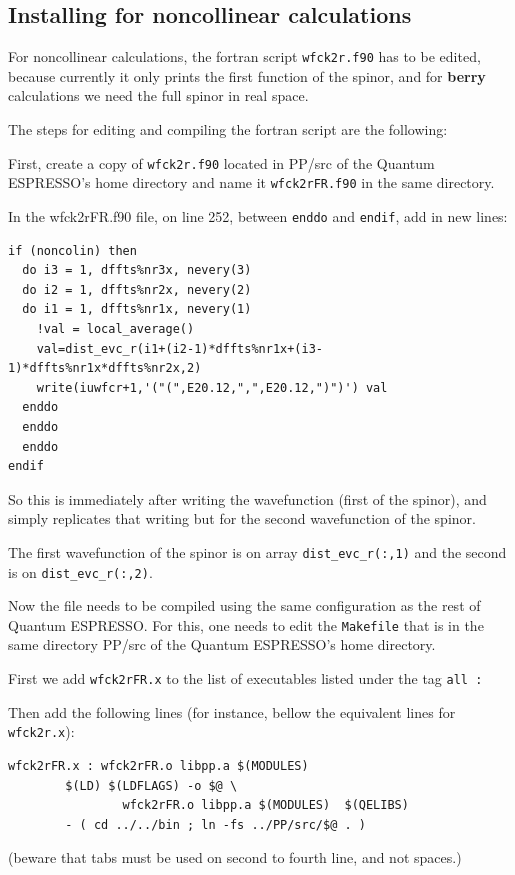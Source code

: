\documentclass[a4paper,12pt]{report}
\begin{document}
\begin{appendices}

\chapter{Installing for noncollinear calculations}
\label{ch:noncolinear}

For noncollinear calculations, the fortran script \verb|wfck2r.f90| has to be edited,
because currently it only prints the first function of the spinor,
and for \textbf{berry} calculations we need the full spinor in real space.


The steps for editing and compiling the fortran script are the following:

First, create a copy of \verb|wfck2r.f90| located in PP/src of the {\sc Quantum ESPRESSO}'s home directory
and name it \verb|wfck2rFR.f90| in the same directory.

In the wfck2rFR.f90 file, on line 252, between \verb|enddo| and \verb|endif|, add in new lines:
\begin{verbatim}
if (noncolin) then
  do i3 = 1, dffts%nr3x, nevery(3)
  do i2 = 1, dffts%nr2x, nevery(2)
  do i1 = 1, dffts%nr1x, nevery(1)
    !val = local_average()
    val=dist_evc_r(i1+(i2-1)*dffts%nr1x+(i3-1)*dffts%nr1x*dffts%nr2x,2)
    write(iuwfcr+1,'("(",E20.12,",",E20.12,")")') val
  enddo
  enddo
  enddo
endif
\end{verbatim}
So this is immediately after writing the wavefunction (first of the spinor),
and simply replicates that writing but for the second wavefunction of the spinor.

The first wavefunction of the spinor is on array \verb|dist_evc_r(:,1)| and the second is on
\verb|dist_evc_r(:,2)|.

Now the file needs to be compiled using the same configuration as the rest of {\sc Quantum ESPRESSO}.
For this, one needs to edit  the \verb|Makefile| that is in the same directory PP/src of the {\sc Quantum ESPRESSO}'s home directory.

First we add \verb|wfck2rFR.x| to the list of executables listed under the tag \verb|all : |

Then add the following lines (for instance, bellow  the equivalent lines for \verb|wfck2r.x|):

\begin{verbatim}
wfck2rFR.x : wfck2rFR.o libpp.a $(MODULES)
        $(LD) $(LDFLAGS) -o $@ \
                wfck2rFR.o libpp.a $(MODULES)  $(QELIBS)
        - ( cd ../../bin ; ln -fs ../PP/src/$@ . )
\end{verbatim}
(beware that tabs must be used on second to fourth line, and not spaces.)


\end{appendices}
\end{document}
